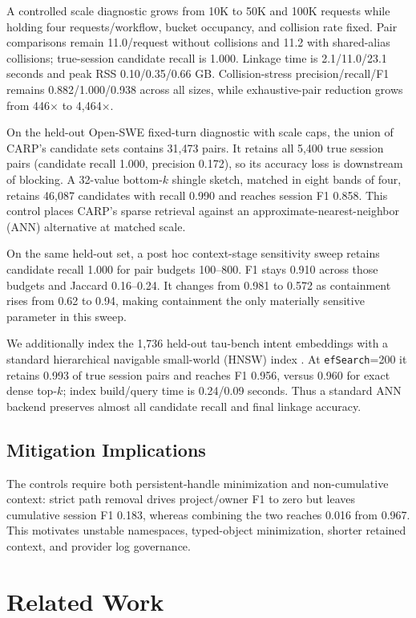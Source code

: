 \documentclass[letterpaper]{article}
\newcommand{\carp}{\textsc{CARP}\xspace}
\begin{document}
A controlled scale diagnostic grows from 10K to 50K and 100K requests while holding
four requests/workflow, bucket occupancy, and collision rate fixed. Pair comparisons remain
11.0/request without collisions and 11.2 with shared-alias collisions; true-session candidate recall
is 1.000. Linkage time is 2.1/11.0/23.1 seconds and peak RSS 0.10/0.35/0.66 GB. Collision-stress
precision/recall/F1 remains 0.882/1.000/0.938 across all sizes, while exhaustive-pair reduction
grows from 446$\times$ to 4,464$\times$.

On the held-out Open-SWE fixed-turn diagnostic with scale caps, the union of \carp's candidate sets
contains 31,473 pairs. It retains all 5,400 true session pairs (candidate recall 1.000, precision
0.172), so its accuracy loss is downstream of blocking. A 32-value bottom-$k$ shingle sketch,
matched in eight bands of
four, retains 46,087 candidates with recall 0.990 and reaches session F1 0.858. This control places
\carp's sparse retrieval against an approximate-nearest-neighbor (ANN) alternative at matched scale.

On the same held-out set, a post hoc context-stage sensitivity sweep retains candidate recall 1.000
for pair budgets 100--800. F1 stays 0.910 across those budgets and Jaccard 0.16--0.24. It changes
from 0.981 to 0.572 as containment rises from 0.62 to 0.94, making containment the only materially
sensitive parameter in this sweep.

We additionally index the 1,736 held-out tau-bench intent embeddings with a standard hierarchical
navigable small-world (HNSW) index \cite{malkov2020hnsw}. At
\texttt{efSearch}=200 it retains 0.993 of true session pairs and reaches F1 0.956, versus 0.960 for
exact dense top-$k$; index build/query time is 0.24/0.09 seconds. Thus a standard ANN backend
preserves almost all candidate recall and final linkage accuracy.

\subsection{Mitigation Implications}

The controls require both persistent-handle minimization and non-cumulative context: strict path
removal drives project/owner F1 to zero but leaves cumulative session F1 0.183, whereas combining
the two reaches 0.016 from 0.967. This motivates unstable namespaces, typed-object minimization,
shorter retained context, and provider log governance.

\section{Related Work}
\end{document}
